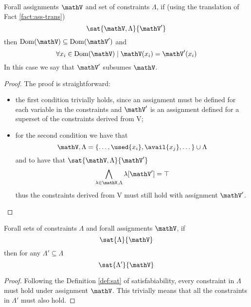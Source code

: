 \begin{lemma}
	\label{lemma:constr}
	Forall assignments $\mathV$ and set of constraints $\Lambda$, if (using the translation of Fact \ref{fact:ass-trans})
	$$ \sat{\mathV, \Lambda}{\mathV'} $$
	then $\mathrm{Dom}(\mathV) \subseteq \mathrm{Dom}(\mathV')$ and
	$$ \forall x_i \in \mathrm{Dom}(\mathV) \mid \mathV(x_i) = \mathV'(x_i) $$
	In this case we say that $\mathV'$ subsumes $\mathV$.
\end{lemma}
\begin{proof}
	The proof is straightforward: 
	\begin{itemize}
		\item the first condition trivially holds, since an assignment must be defined for each variable in the constraints and $\mathV'$ is an assignment defined for a superset of the constraints derived from V;
		\item for the second condition we have that
			$$ \mathV, \Lambda = \{ \dots, \used{x_i}, \avail{x_j}, \dots \} \cup \Lambda $$
		and to have that $ \sat{\mathV, \Lambda}{\mathV'} $
			$$ \bigwedge_{\lambda \in \mathV, \Lambda} \lambda[\mathV'] = \top $$
		thus the constraints derived from V must still hold with assignment $\mathV'$.
	\end{itemize}
\end{proof}
\begin{lemma}
	\label{lemma:subsume}
	Forall sets of constraints $\Lambda$ and forall assignments $\mathV$, if
	$$ \sat{\Lambda}{\mathV} $$
	then for any $\Lambda' \subseteq \Lambda$
	$$ \sat{\Lambda'}{\mathV} $$
\end{lemma}
\begin{proof}
	Following the Definition \ref{def:sat} of satisfabiability, every constraint in $\Lambda$ must hold under assignment $\mathV$.
	This trivially means that all the constraints in $\Lambda'$ must also hold.
\end{proof}

